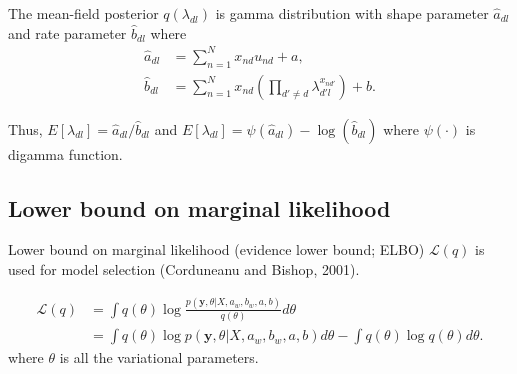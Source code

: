 \documentclass[12pt]{amsart}
\begin{document}
The mean-field posterior $q(\lambda_{dl})$ is gamma distribution with shape parameter $\hat a_{dl}$ and rate parameter $\hat b_{dl}$ where
\begin{align}
\hat a_{dl} &= \sum_{n=1}^{N}  x_{nd} u_{nd} + a, \\
\hat b_{dl} &= \sum_{n=1}^{N} x_{nd} \left( \prod_{d'\neq d} \lambda_{d' l}^{x_{nd'}} \right) + b.
\end{align}

Thus, $E[\lambda_{dl}] = \hat a_{dl} / \hat b_{dl}$ and $E[\lambda_{dl}] = \psi (\hat a_{dl}) - \log( \hat b_{dl})$ where $\psi(\cdot)$ is digamma function.

\subsection*{Lower bound on marginal likelihood}
Lower bound on marginal likelihood (evidence lower bound; ELBO) $\mathcal{L}(q)$ is used for model selection (Corduneanu and Bishop, 2001).

\begin{align}
\mathcal{L}(q) &= \int q(\theta) \log \frac{p(\boldsymbol{y},\theta|X,a_w, b_w, a, b)}{q(\theta)} d\theta \\
&=\int q(\theta) \log p(\boldsymbol{y},\theta|X,a_w, b_w, a, b) d\theta - \int q(\theta) \log q(\theta) d\theta \label{ELBO}.
\end{align}
where $\theta$ is all the variational parameters.
\end{document}
